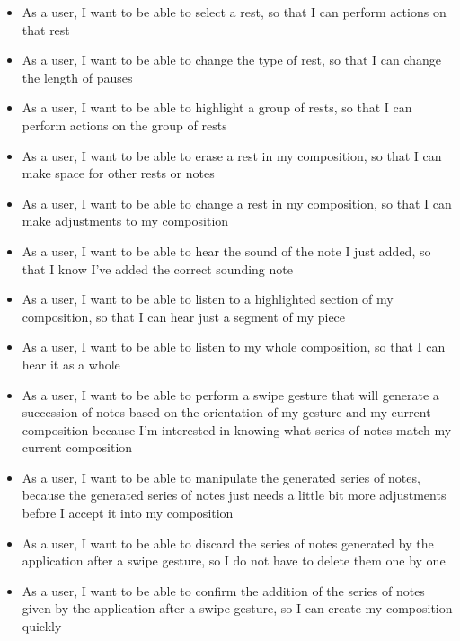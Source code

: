 \begin{itemize}
    \item As a user, I want to be able to select a rest, so that I can perform actions on that rest
    \item As a user, I want to be able to change the type of rest, so that I can change the length of pauses
    \item As a user, I want to be able to highlight a group of rests, so that I can perform actions on the group of rests
    \item As a user, I want to be able to erase a rest in my composition, so that I can make space for other rests or notes
    \item As a user, I want to be able to change a rest in my composition, so that I can make adjustments to my composition
    \item As a user, I want to be able to hear the sound of the note I just added, so that I know I've added the correct sounding note
    \item As a user, I want to be able to listen to a highlighted section of my composition, so that I can hear just a segment of my piece
    \item As a user, I want to be able to listen to my whole composition, so that I can hear it as a whole
    \item As a user, I want to be able to perform a swipe gesture that will generate a succession of notes based on the orientation of my gesture and my current composition because I'm interested in knowing what series of notes match my current composition
    \item As a user, I want to be able to manipulate the generated series of notes, because the generated series of notes just needs a little bit more adjustments before I accept it into my composition
    \item As a user, I want to be able to discard the series of notes generated by the application after a swipe gesture, so I do not have to delete them one by one
    \item As a user, I want to be able to confirm the addition of the series of notes given by the application after a swipe gesture, so I can create my composition quickly

\end{itemize}
